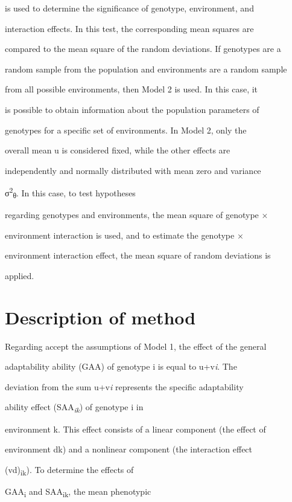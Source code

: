 \documentclass[10pt,twoside]{article}
\numberwithin{equation}{section}
\begin{document}
is used to determine the significance of genotype, environment, and

interaction effects. In this test, the corresponding mean squares are

compared to the mean square of the random deviations. If genotypes are a

random sample from the population and environments are a random sample

from all possible environments, then Model 2 is used. In this case, it

is possible to obtain information about the population parameters of

genotypes for a specific set of environments. In Model 2, only the

overall mean u is considered fixed, while the other effects are

independently and normally distributed with mean zero and variance

σ\textsuperscript{2}\textsubscript{θ}. In this case, to test hypotheses

regarding genotypes and environments, the mean square of genotype ×

environment interaction is used, and to estimate the genotype ×

environment interaction effect, the mean square of random deviations is

applied.



\section{Description of method}



Regarding accept the assumptions of Model 1, the effect of the general

adaptability ability (GAA) of genotype i is equal to u+v\emph{i}. The

deviation from the sum u+v\emph{i} represents the specific adaptability

ability effect (SAA\emph{\textsubscript{ik}}) of genotype i in

environment k. This effect consists of a linear component (the effect of

environment dk) and a nonlinear component (the interaction effect

(vd)\textsubscript{ik}). To determine the effects of

GAA\textsubscript{i} and SAA\textsubscript{ik}, the mean phenotypic
\end{document}
